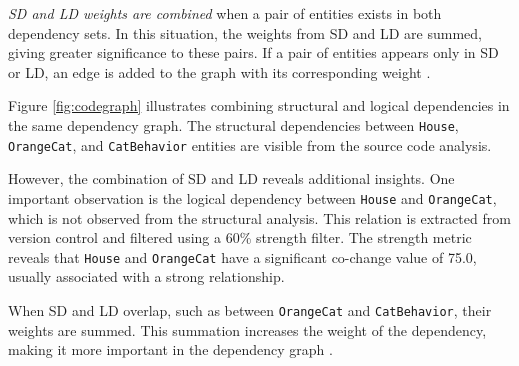 \textit{SD and LD weights are combined} when a pair of entities exists in both dependency sets. In this situation, the weights from SD and LD are summed, giving greater significance to these pairs. If a pair of entities appears only in SD or LD, an edge is added to the graph with its corresponding weight \cite{cluster-access}.

Figure \ref{fig:codegraph} illustrates combining structural and logical dependencies in the same dependency graph. The structural dependencies between \texttt{House}, \texttt{OrangeCat}, and \texttt{CatBehavior} entities are visible from the source code analysis.

However, the combination of SD and LD reveals additional insights. One important observation is the logical dependency between \texttt{House} and \texttt{OrangeCat}, which is not observed from the structural analysis. This relation is extracted from version control and filtered using a 60\% strength filter. The strength metric reveals that \texttt{House} and \texttt{OrangeCat} have a significant co-change value of 75.0, usually associated with a strong relationship.

When SD and LD overlap, such as between \texttt{OrangeCat} and \texttt{CatBehavior}, their weights are summed. This summation increases the weight of the dependency, making it more important in the dependency graph \cite{cluster-access}.


